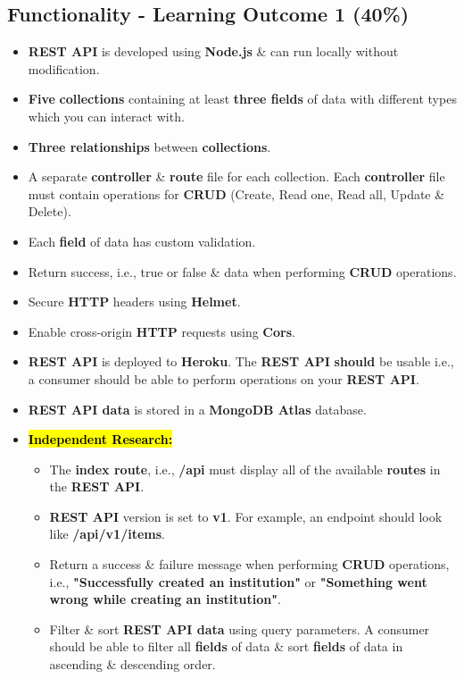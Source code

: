 \documentclass{article}
\begin{document}
\subsection*{Functionality - Learning Outcome 1 (40\%)}
\begin{itemize}
	\item \textbf{REST API} is developed using \textbf{Node.js} \& can run locally without modification.
	\item \textbf{Five} \textbf{collections} containing at least \textbf{three fields} of data with different types which you can interact with.
	\item \textbf{Three relationships} between \textbf{collections}.
	\item A separate \textbf{controller} \& \textbf{route} file for each collection. Each \textbf{controller} file must contain operations for \textbf{CRUD} (Create, Read one, Read all, Update \& Delete).
	\item Each \textbf{field} of data has custom validation.
	\item Return success, i.e., true or false \& data when performing \textbf{CRUD} operations.
	\item Secure \textbf{HTTP} headers using \textbf{Helmet}. 
	\item Enable cross-origin \textbf{HTTP} requests using \textbf{Cors}.
	\item \textbf{REST API} is deployed to \textbf{Heroku}. The \textbf{REST API} \textbf{should} be usable i.e., a consumer should be able to perform operations on your \textbf{REST API}.
	\item \textbf{REST API data} is stored in a \textbf{MongoDB Atlas} database.
	\item \hl{\textbf{Independent Research:}}
	\begin{itemize}
		\item The \textbf{index route}, i.e., \textbf{/api} must display all of the available \textbf{routes} in the \textbf{REST API}.
		\item \textbf{REST API} version is set to \textbf{v1}. For example, an endpoint should look like \textbf{/api/v1/items}.
		\item Return a success \& failure message when performing \textbf{CRUD} operations, i.e., \textbf{"Successfully created an institution"} or \textbf{"Something went wrong while creating an institution"}.
		\item Filter \& sort \textbf{REST API data} using query parameters. A consumer should be able to filter all \textbf{fields} of data \& sort \textbf{fields} of data in ascending \& descending order.

\end{itemize}
\end{itemize}
\end{document}
